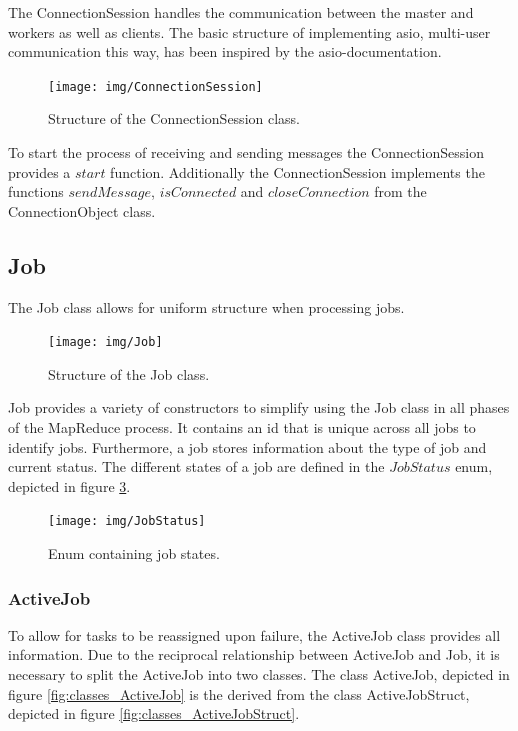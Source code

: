 \documentclass[12pt, letterpaper]{article}
\begin{document}
The ConnectionSession handles the communication between the master and workers as well as clients.
The basic structure of implementing asio, multi-user communication this way, has been inspired by the asio-documentation.

\begin{figure}[h]
	\centering
	\texttt{[image: img/ConnectionSession]}
	\caption{Structure of the ConnectionSession class.}
	\label{fig:classes_ConnectionSession}
\end{figure}

To start the process of receiving and sending messages the ConnectionSession provides a $start$ function. Additionally the ConnectionSession implements the functions $sendMessage$, $isConnected$ and $closeConnection$ from the ConnectionObject class.  

\subsection{Job}

The Job class allows for uniform structure when processing jobs.

\begin{figure}[h]
	\centering
	\texttt{[image: img/Job]}
	\caption{Structure of the Job class.}
	\label{fig:classes_Job}
\end{figure}

Job provides a variety of constructors to simplify using the Job class in all phases of the MapReduce process. It contains an id that is unique across all jobs to identify jobs. Furthermore, a job stores information about the type of job and current status. The different states of a job are defined in the $JobStatus$ enum, depicted in figure \ref{fig:classes_JobStatus}.

\begin{figure}[h]
	\centering
	\texttt{[image: img/JobStatus]}
	\caption{Enum containing job states.}
	\label{fig:classes_JobStatus}
\end{figure}

\subsubsection{ActiveJob}

To allow for tasks to be reassigned upon failure, the ActiveJob class provides all information.
Due to the reciprocal relationship between ActiveJob and Job, it is necessary to split the ActiveJob into two classes. The class ActiveJob, depicted in figure \ref{fig:classes_ActiveJob} is the derived from the class ActiveJobStruct, depicted in figure \ref{fig:classes_ActiveJobStruct}.
\end{document}
